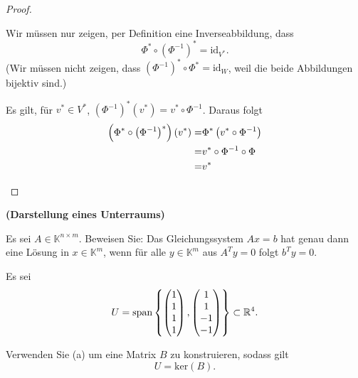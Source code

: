 \begin{proof}
\begin{parts}
		\begin{tcolorbox}[title=Vereinfachung]
Wir müssen nur zeigen, per Definition eine Inverseabbildung, dass
			\[
				\Phi^*\circ \left( \Phi^{-1} \right) ^*=\text{id}_{V^*}
			.\] 
			(Wir müssen nicht zeigen, dass $\left( \Phi^{-1} \right) ^*\circ\Phi^*=\text{id}_W$, weil die beide Abbildungen bijektiv sind.)
		\end{tcolorbox}
		Es gilt, f\"{u}r $v^*\in V^*$, $\left( \Phi^{-1} \right)^*(v^*)=v^*\circ\Phi^{-1}$. Daraus folgt
		\begin{align*}
			\left(\Phi^*\circ\left( \Phi^{-1} \right)^*\right)(v^*)=&\Phi^*\left( v^*\circ \Phi^{-1} \right) \\
			=& v^*\circ\Phi^{-1}\circ\Phi\\
			=& v^*\qedhere
		\end{align*}
	\end{parts}
\end{proof}
\begin{Problem}	\textbf{(Darstellung eines Unterraums)}
	\begin{parts}
\item Es sei $A\in\mathbb{K}^{n\times m}$. Beweisen Sie: Das Gleichungssystem $Ax=b$ hat genau dann eine Lösung in $x\in \mathbb{K}^m$, wenn f\"{u}r alle $y\in \mathbb{K}^m$ aus  $A^Ty=0$ folgt $b^Ty=0$.
\item Es sei
	\[
		U=\text{span}\left\{ \begin{pmatrix} 1 \\ 1 \\ 1 \\ 1 \end{pmatrix} ,\begin{pmatrix} 1 \\ 1 \\ -1 \\ -1 \end{pmatrix}  \right\} \subset \mathbb{R}^4
	.\] 
\item Verwenden Sie (a) um eine Matrix $B$ zu konstruieren, sodass gilt
	\[
		U=\text{ker}(B)
	.\] 
\end{parts}
\end{Problem}
